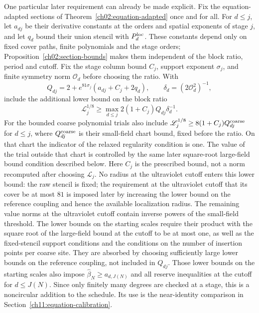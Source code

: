 One particular later requirement can already be made explicit.
Fix the equation-adapted sections of
Theorem~\ref{ch02:equation-adapted} once and for all.
For $d\le j$, let $a_{dj}$ be their derivative constants at the
orders and spatial exponents of stage $j$, and let $q_d$ bound their
union stencil with $P_d^{\rm loc}$. These constants depend only on
fixed cover paths, finite polynomials and the stage orders;
Proposition~\ref{ch02:section-bounds} makes them independent of
the block ratio, period and cutoff. Fix the stage column bound
$C_j$, support exponent $\sigma_j$, and finite symmetry norm
$\mathcal O_d$ before choosing the ratio. With
\[
 Q_{dj}=2+e^{81\sigma_j}(a_{dj}+C_j+2q_d),
 \qquad \delta_d=(2\mathcal O_d^2)^{-1},
\]
include the additional lower bound on the block ratio
\begin{equation}\label{ch10:equation-floor}
 \mathscr L_j^{1/8}\ge
       \max_{d\le j}2(1+C_j)Q_{dj}\delta_d^{-1}.
\end{equation}
For the bounded coarse polynomial trials also include
$\mathscr L_j^{1/8}\ge8(1+C_j)Q^{\rm coarse}_{dj}$ for $d\le j$,
where $Q^{\rm coarse}_{dj}$ is their small-field chart bound, fixed before
the ratio. On that chart the indicator of the relaxed regularity condition is one. The
value of the trial outside that chart is controlled by the same later
square-root large-field bound condition described below.
Here $C_j$ is the prescribed bound, not a norm recomputed after
choosing $\mathscr L_j$. No radius at the ultraviolet cutoff enters this lower bound:
the raw stencil is fixed; the requirement at the ultraviolet cutoff that its cover
be at most $81$ is imposed later by increasing the lower bound on the
reference coupling and hence the available localization radius.
The remaining value norms at the ultraviolet cutoff contain inverse powers of the
small-field threshold. The lower bounds on the starting scales require their product with the
square root of the large-field bound at the cutoff to be at most one,
as well as the fixed-stencil support conditions and the conditions on the number of insertion points per coarse site.
They are absorbed by choosing sufficiently large lower bounds on the reference coupling,
not included in $Q_{dj}$. Those lower bounds on the starting scales also impose
$\widehat\beta_N\ge a_{d,J(N)}$ and all reserve inequalities at the cutoff
for $d\le J(N)$. Since only finitely many degrees are checked at a
stage, this is a noncircular addition to the schedule. Its use is
the near-identity comparison in
Section~\ref{ch11:equation-calibration}.

